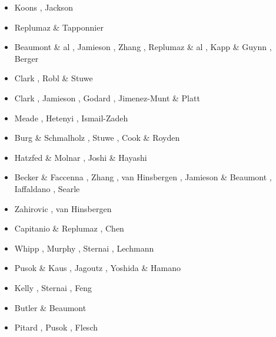 \begin{itemize}
\begin{scriptsize}
\begin{itemize}
\item[\twothousandtwo] Koons \etal \cite{kozc02}, Jackson \cite{jack02}
\item[\twothousandthree] Replumaz \& Tapponnier \cite{reta03}
\item[\twothousandfour] Beaumont \& al \cite{bejn04}, Jamieson \etal \cite{jabm04}, 
                        Zhang \etal \cite{zhsw04}, Replumaz \& al \cite{rekv04}, 
                        Kapp \& Guynn \cite{kagu04}, Berger \etal \cite{bejh04}
\item[\twothousandfive] Clark \etal \cite{clbr05}, Robl \& Stuwe \cite{rost05a,rost05b}
\item[\twothousandsix] Clark \etal \cite{clrw06}, Jamieson \etal \cite{jabn06}, 
                       Godard \etal \cite{golc06}, Jimenez-Munt \& Platt \cite{jipl06}
\item[\twothousandseven] Meade \cite{mead07}, Hetenyi \etal \cite{hecb07},
                         Ismail-Zadeh \etal \cite{isls07}
\item[\twothousandeight] Burg \& Schmalholz \cite{busc08}, Stuwe \etal \cite{strh08},
                         Cook \& Royden \cite{coro08}
\item[\twothousandten] Hatzfed \& Molnar \cite{hamo10}, Joshi \& Hayashi \cite{joha10}
\item[\twothousandeleven] Becker \& Faccenna \cite{befa11}, Zhang \etal \cite{zhxy11}, 
                          van Hinsbergen \etal \cite{vasd11}, Jamieson \& Beaumont \cite{jabe11},
                          Iaffaldano \etal \cite{iahb11}, Searle \etal \cite{seep11}
\item[\twothousandtwelve] Zahirovic \etal \cite{zams12}, van Hinsbergen \etal \cite{vald12}
\item[\twothousandthirteen] Capitanio \& Replumaz \cite{care13}, Chen \etal \cite{chgz13,chgz13b}
\item[\twothousandfourteen] Whipp \etal \cite{whbb14}, Murphy \etal \cite{mutg14},
                            Sternai \etal \cite{stjm14}, Lechmann \etal \cite{lesh14}
\item[\twothousandfifteen] Pusok \& Kaus \cite{puka15}, Jagoutz \etal \cite{jarh15}, 
                           Yoshida \& Hamano\cite{yoha15}
\item[\twothousandsixteen] Kelly \etal \cite{kebb16}, Sternai \etal \cite{staj16},
                           Feng \etal \cite{fezl16}
\item[\twothousandseventeen] Butler \& Beaumont \cite{bube17}
\item[\twothousandeighteen] Pitard \etal \cite{pirf18}, Pusok \etal \cite{pukp18}, Flesch \etal \cite{flbb18}

\end{itemize}
\end{scriptsize}
\end{itemize}
